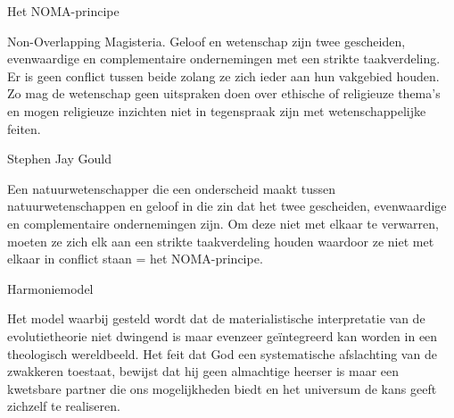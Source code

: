 \documentclass[main.tex]{subfiles}
\begin{document}
\begin{examenvraag}
    \begin{vraag}
        Het NOMA-principe
    \end{vraag}

    \begin{antwoord}
	Non-Overlapping Magisteria.‭ ‬Geloof en wetenschap zijn twee gescheiden,‭ ‬evenwaardige en 
	complementaire ondernemingen met een strikte taakverdeling.‭ ‬Er is geen conflict tussen beide 
	zolang ze zich ieder aan hun vakgebied houden.‭ ‬Zo mag de wetenschap geen uitspraken doen over 
	ethische of religieuze thema‭’‬s en mogen religieuze inzichten niet in tegenspraak zijn met 
	wetenschappelijke feiten.
    \end{antwoord}
\end{examenvraag}


\begin{examenvraag}
    \begin{vraag}
        Stephen Jay Gould
    \end{vraag}

    \begin{antwoord}
	Een natuurwetenschapper die een onderscheid maakt tussen natuurwetenschappen en geloof in die 
	zin dat het twee gescheiden,‭ ‬evenwaardige en complementaire ondernemingen zijn.‭ ‬Om deze niet 
	met elkaar te verwarren,‭ ‬moeten ze zich elk aan een strikte taakverdeling houden waardoor ze 
	niet met elkaar in conflict staan‭ = ‬het NOMA-principe.
    \end{antwoord}
\end{examenvraag}


\begin{examenvraag}
    \begin{vraag}
        Harmoniemodel
    \end{vraag}

    \begin{antwoord}
	Het model waarbij‭ ‬gesteld wordt dat de materialistische interpretatie van de evolutietheorie 
	niet dwingend is maar evenzeer geïntegreerd kan worden in een theologisch‭ ‬wereldbeeld.‭ ‬Het feit 
	dat God een systematische afslachting van de zwakkeren toestaat,‭ ‬bewijst dat hij geen 
	almachtige heerser is maar een kwetsbare partner die ons mogelijkheden biedt en het universum 
	de kans geeft zichzelf te realiseren.
    \end{antwoord}
\end{examenvraag}
\end{document}
